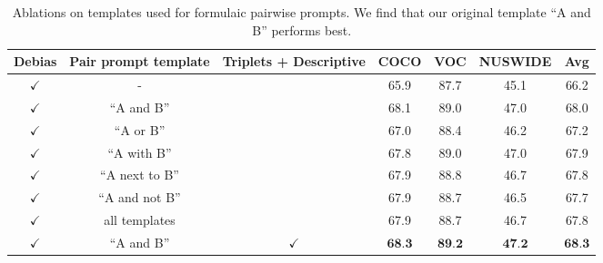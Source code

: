 \begin{table*}[ht]
\centering
\begin{tabular}{ccc|ccc|c}
\toprule
Debias & Pair prompt template & Triplets + Descriptive & COCO & VOC & NUSWIDE & Avg  \\
\midrule
$\checkmark$ & - & & 65.9 & 87.7 & 45.1 & 66.2 \\
$\checkmark$ & ``A and B'' & & 68.1 & 89.0 & 47.0 & 68.0 \\
$\checkmark$ & ``A or B'' & & 67.0 & 88.4 & 46.2 & 67.2 \\
$\checkmark$ & ``A with B'' & & 67.8 & 89.0 & 47.0 & 67.9 \\
$\checkmark$ & ``A next to B'' & & 67.9 & 88.8 & 46.7 & 67.8 \\
$\checkmark$ & ``A and not B'' & & 67.9 & 88.7 & 46.5 & 67.7 \\
$\checkmark$ & all templates & & 67.9 & 88.7 & 46.7 & 67.8 \\
$\checkmark$ & ``A and B'' & $\checkmark$ & $\textbf{68.3}$ & $\textbf{89.2}$ & $\textbf{47.2}$ & $\textbf{68.3}$ \\
\bottomrule
\end{tabular}
\caption{Ablations on templates used for formulaic pairwise prompts. We find that our original template ``A and B'' performs best.}
\label{tab:compoundPromptTemplateAblation}
\end{table*}
